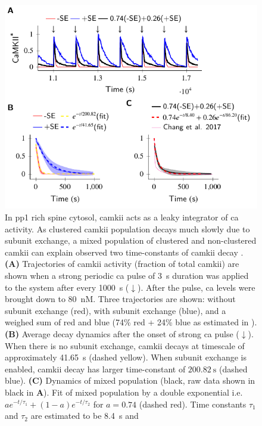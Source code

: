 \documentclass[9pt,lineno,doublespacing]{elife}
\begin{document}
\begin{figure}%
    \includegraphics[width=11.4cm]{PaperFigures/elifeFigure6/figure_two_timecourses_114mm.pdf}
    \caption{ In \gls{pp1} rich spine cytosol, \gls{camkii} acts as a leaky integrator of \gls{ca} 
        activity. As clustered \gls{camkii} population decays much slowly due
        to subunit exchange, a mixed population of clustered and non-clustered \gls{camkii}
        can explain observed two time-constants of \gls{camkii} decay \citep{chang_camkii_2017}.
        \textbf{(A)} Trajectories of \gls{camkii} activity (fraction of total \gls{camkii})
        are shown when a strong periodic \gls{ca} pulse of \SI{3}{\second}
        duration was applied to the system after every \SI{1000}{\second} ($\downarrow$).
        After the pulse, \gls{ca} levels were brought down to \SI{80}{\nano M}. 
        Three trajectories are shown: without subunit exchange (red), with
        subunit exchange (blue), and a weighed sum of red and blue (74\%
        red + 24\% blue as estimated in \citep{chang_camkii_2017}). 
        \textbf{(B)} Average decay dynamics after the onset of strong \gls{ca} pulse ($\downarrow$). 
        When there is no subunit exchange, \gls{camkii} decays at timescale of
        approximately \SI{41.65}{\second} (dashed yellow). When subunit exchange is enabled, 
        \gls{camkii} decay has larger time-constant of $\SI{200.82}{\second}$ (dashed blue). 
        \textbf{(C)} Dynamics of mixed population (black, raw data shown in
        black in \textbf{A}). Fit of mixed population by a double
        exponential i.e. $ae^{-t/\tau_{1}}+(1-a)e^{-t/\tau_{2}}$ for
        $a=0.74$ (dashed red). Time constants $\tau_1$ and $\tau_2$ are estimated to be \SI{8.4}{\second} and
}
\end{figure}
\end{document}
